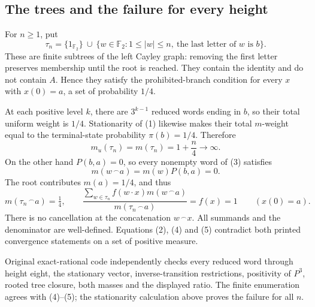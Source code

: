\documentclass[10pt]{article}
\begin{document}
\subsection*{The trees and the failure for every height}
For \(n\ge1\), put \[\tau_n=\{1_{\mathbb F_2}\}\ \cup\
 \{w\in\mathbb F_2:1\le |w|\le n,\ \text{the last letter of }w\text{ is }b\}.
 \tag{3}\] These are finite subtrees of the left Cayley graph: removing the first letter preserves membership until the root is reached. They contain the identity and do not contain \(A\). Hence they satisfy the prohibited-branch condition for every \(x\) with \(x(0)=a\), a set of probability \(1/4\).\par
At each positive level \(k\), there are \(3^{k-1}\) reduced words ending in \(b\), so their total uniform weight is \(1/4\). Stationarity of (1) likewise makes their total \(m\)-weight equal to the terminal-state probability \(\pi(b)=1/4\). Therefore \[m_u(\tau_n)=m(\tau_n)=1+\frac n4\longrightarrow\infty.
 \tag{4}\] On the other hand \(P(b,a)=0\), so every nonempty word of (3) satisfies \[m(w\,^{\frown}a)=m(w)P(b,a)=0.\] The root contributes \(m(a)=1/4\), and thus \[m(\tau_n\,^{\frown}a)=\tfrac14,\qquad
 \frac{\sum_{w\in\tau_n}f(w\cdot x)m(w\,^{\frown}a)}
      {m(\tau_n\,^{\frown}a)}
 =f(x)=1\qquad(x(0)=a).
 \tag{5}\] There is no cancellation at the concatenation \(w\,^{\frown}x\). All summands and the denominator are well-defined. Equations (2), (4) and (5) contradict both printed convergence statements on a set of positive measure.\par
Original exact-rational code independently checks every reduced word through height eight, the stationary vector, inverse-transition restrictions, positivity of \(P^3\), rooted tree closure, both masses and the displayed ratio. The finite enumeration agrees with (4)–(5); the stationarity calculation above proves the failure for all \(n\).\par
\end{document}
